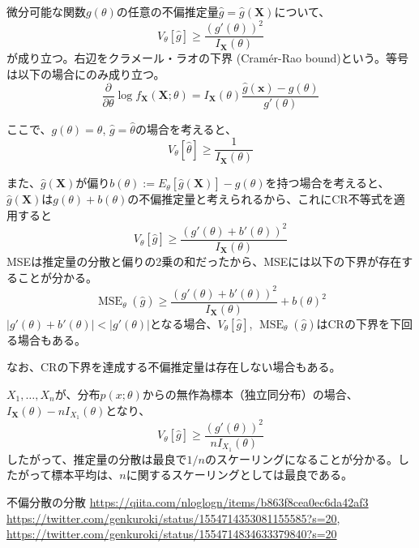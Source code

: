 \documentclass[uplatex,dvipdfmx]{jlreq}
\newcommand\term[1]{\textsf{#1}}
\begin{document}
\begin{theorem}
    微分可能な関数$g(\theta)$の任意の不偏推定量$\hat{g}=\hat{g}(\boldsymbol{X})$について、
    \begin{equation}
        V_\theta[\hat{g}] \geq
        \frac{(g'(\theta))^2}{I_{\boldsymbol{X}}(\theta)}
    \end{equation}
    が成り立つ。右辺を\term{クラメール・ラオの下界 (Cram\'{e}r-Rao bound)}という。等号は以下の場合にのみ成り立つ。
    \begin{equation}
        \frac{\partial}{\partial\theta}
        \log f_{\boldsymbol{X}}(\boldsymbol{X}; \theta)
        = I_{\boldsymbol{X}}(\theta)
        \frac{\hat{g}(\boldsymbol{x}) - g(\theta)}{g'(\theta)}
    \end{equation}
\end{theorem}

ここで、$g(\theta)=\theta$, $\hat{g}=\hat{\theta}$の場合を考えると、
\begin{equation}
    V_\theta[\hat{\theta}] \geq \frac{1}{I_{\boldsymbol{X}}(\theta)}
\end{equation}

また、$\hat{g}(\boldsymbol{X})$が偏り$b(\theta):=E_\theta[\hat{g}(\boldsymbol{X})]-g(\theta)$を持つ場合を考えると、$\hat{g}(\boldsymbol{X})$は$g(\theta)+b(\theta)$の不偏推定量と考えられるから、これにCR不等式を適用すると
\begin{equation}
    V_\theta[\hat{g}] \geq
    \frac{(g'(\theta)+b'(\theta))^2}{I_{\boldsymbol{X}}(\theta)}
\end{equation}
MSEは推定量の分散と偏りの2乗の和だったから、MSEには以下の下界が存在することが分かる。
\begin{equation}
    \operatorname{MSE}_\theta(\hat{g}) \geq
    \frac{(g'(\theta)+b'(\theta))^2}{I_{\boldsymbol{X}}(\theta)}
    + b(\theta)^2
\end{equation}
$|g'(\theta)+b'(\theta)|< |g'(\theta)|$となる場合、$V_\theta[\hat{g}]$, $\operatorname{MSE}_\theta(\hat{g})$はCRの下界を下回る場合もある。

なお、CRの下界を達成する不偏推定量は存在しない場合もある。

$X_1, \dotsc, X_n$が、分布$p(x; \theta)$からの無作為標本（独立同分布）の場合、$I_{\boldsymbol{X}}(\theta) - nI_{X_1}(\theta)$となり、
\begin{equation}
    V_\theta[\hat{g}] \geq
    \frac{(g'(\theta))^2}{nI_{X_1}(\theta)}
\end{equation}
したがって、推定量の分散は最良で$1/n$のスケーリングになることが分かる。したがって標本平均は、$n$に関するスケーリングとしては最良である。

\begin{thebibliography}{9}
     不偏分散の分散 \url{https://qiita.com/nloglogn/items/b863f8cea0ec6da42af3}
     \url{https://twitter.com/genkuroki/status/1554714353081155585?s=20}, \url{https://twitter.com/genkuroki/status/1554714834633379840?s=20}
\end{thebibliography}
\end{document}

